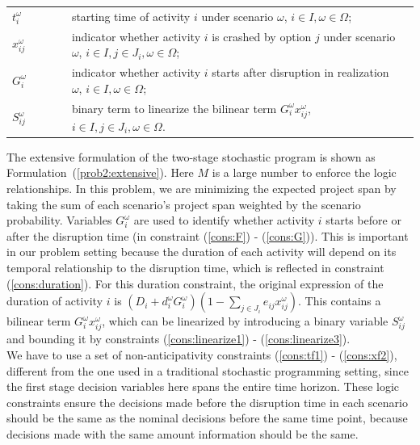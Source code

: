 \documentclass[11pt]{article}
\newcommand{\noi}{\noindent}
\begin{document}
\begin{longtable}[H]{ l l l l }
		\(t_{i}^\omega\) & \(\qquad\) & starting time of activity \(i\) under scenario \(\omega\), \(i \in I, \omega \in \Omega\);&\\
		\(x_{ij}^\omega\) & \(\qquad\) & indicator whether activity \(i\) is crashed by option \(j\) under scenario \(\omega\), \(i \in I, j \in J_i, \omega \in \Omega \); &\\
		\(G_i^\omega\) & \(\qquad\) & indicator whether activity \(i\) starts after disruption in realization \(\omega\), \(i \in I, \omega \in \Omega\);&\\
		\(S_{ij}^\omega\) & \(\qquad\) & binary term to linearize the bilinear term \(G_i^\omega x_{ij}^\omega\), \(i \in I, j \in J_{i}, \omega \in \Omega\).&\\
	\end{longtable}
	\noi The extensive formulation of the two-stage stochastic program is shown as Formulation~(\ref{prob2:extensive}). Here \(M\) is a large number to enforce the logic relationships. In this problem, we are minimizing the expected project span by taking the sum of each scenario's project span weighted by the scenario probability. Variables \(G^\omega_i\) are used to identify whether activity \(i\) starts before or after the disruption time (in constraint (\ref{cons:F}) - (\ref{cons:G})). This is important in our problem setting because the duration of each activity will depend on its temporal relationship to the disruption time, which is reflected in constraint (\ref{cons:duration}). For this duration constraint, the original expression of the duration of activity \(i\) is \((D_i + d_i^\omega G_i^\omega)(1 - \sum_{j \in J_i} e_{ij}x_{ij}^\omega)\). This contains a bilinear term \(G_i^\omega x_{ij}^\omega\), which can be linearized by introducing a binary variable \(S_{ij}^\omega\) and bounding it by constraints (\ref{cons:linearize1}) - (\ref{cons:linearize3}).\\
	\newline
	We have to use a set of non-anticipativity constraints (\ref{cons:tf1}) - (\ref{cons:xf2}), different from the one used in a traditional stochastic programming setting, since the first stage decision variables here spans the entire time horizon. These logic constraints ensure the decisions made before the disruption time in each scenario should be the same as the nominal decisions before the same time point, because decisions made with the same amount information should be the same.\\
\end{document}
